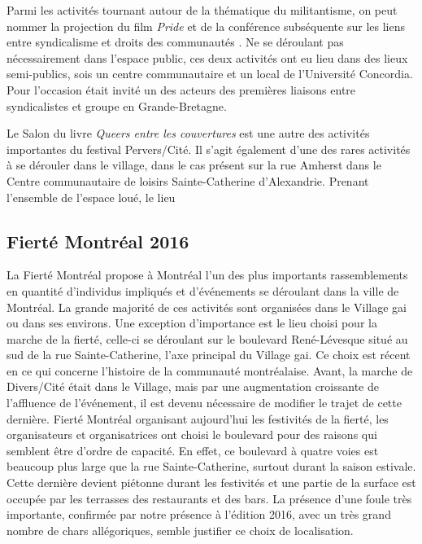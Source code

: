 Parmi les activités tournant autour de la thématique du militantisme, on peut nommer la projection du film \emph{Pride} et de la conférence subséquente sur les liens entre syndicalisme et droits des communautés \lgbt{}.
Ne se déroulant pas nécessairement dans l'espace public, ces deux activités ont eu lieu dans des lieux semi-publics, sois un centre communautaire et un local de l'Université Concordia.
Pour l'occasion était invité un des acteurs  des premières liaisons entre syndicalistes et groupe \lgbt{} en Grande-Bretagne.

Le Salon du livre \emph{Queers entre les couvertures} est une autre des activités importantes du festival Pervers/Cité.
Il s'agit également d'une des rares activités à se dérouler dans le village, dans le cas présent sur la rue Amherst dans le Centre communautaire de loisirs Sainte-Catherine d'Alexandrie.
Prenant l'ensemble de l'espace loué, le lieu
\subsection{Fierté Montréal 2016}
\label{subsec:fiertemontreal2016}
La Fierté Montréal propose à Montréal l'un des plus importants rassemblements \lgbt en quantité d'individus impliqués et d'événements se déroulant dans la ville de Montréal.
La grande majorité de ces activités sont organisées dans le Village gai ou dans ses environs.
Une exception d'importance est le lieu choisi pour la marche de la fierté, celle-ci se déroulant sur le boulevard René-Lévesque situé au sud de la rue Sainte-Catherine, l'axe principal du Village gai.
Ce choix est récent en ce qui concerne l'histoire de la communauté \lgbt montréalaise.
Avant, la marche de Divers/Cité était dans le Village, mais par une augmentation croissante de l'affluence de l'événement, il est devenu nécessaire de modifier le trajet de cette dernière.
Fierté Montréal organisant aujourd'hui les festivités de la fierté, les organisateurs et organisatrices ont choisi le boulevard pour des raisons qui semblent être d'ordre de capacité.
En effet, ce boulevard à quatre voies est beaucoup plus large que la rue Sainte-Catherine, surtout durant la saison estivale.
Cette dernière devient piétonne durant les festivités et une partie de la surface est occupée par les terrasses des restaurants et des bars.
La présence d'une foule très importante, confirmée par notre présence à l'édition 2016, avec un très grand nombre de chars allégoriques, semble justifier ce choix de localisation.


